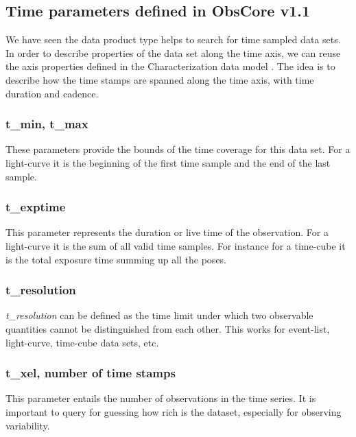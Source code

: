 \documentclass[11pt,a4paper]{ivoa}
\begin{document}
 \subsection{Time parameters defined in ObsCore v1.1}
 \label{sec:alreadythere}
 We have seen the data product type helps to search for time sampled data sets.
 In order to describe properties of the data set along the time axis, we can reuse the axis properties defined in the Characterization data model \citep{2008ivoa.spec.0325L}.
 The idea is to describe how the time stamps are spanned along the time axis, with time duration and  cadence.
 \subsubsection{t\_min, t\_max}
 These parameters provide the bounds of the time coverage for this data set. For a light-curve it is the beginning of the first time sample and the end of the last sample.
  \subsubsection{t\_exptime}
  This parameter represents the duration or live time of the observation.
  For a light-curve it is the sum of all valid time samples. For instance for a time-cube it is the total exposure time summing up all the poses.
  \subsubsection{t\_resolution}
  \emph{t\_resolution} can be defined as the time limit under which two observable quantities cannot be distinguished from each other.
  This works for event-list, light-curve, time-cube data sets, etc.
  \subsubsection{t\_xel, number of time stamps}
This parameter entails the number of observations in the time series. It is important to query for guessing how rich is the dataset, especially for observing variability.


\end{document}

